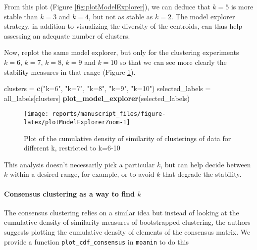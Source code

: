\documentclass[9pt,a4paper,]{extarticle}
\newenvironment{Shaded}{\begin{snugshade}}{\end{snugshade}}
\newcommand{\KeywordTok}[1]{\textcolor[rgb]{0.13,0.29,0.53}{\textbf{#1}}}
\newcommand{\NormalTok}[1]{#1}
\newcommand{\StringTok}[1]{\textcolor[rgb]{0.31,0.60,0.02}{#1}}
\begin{document}
From this plot (Figure \ref{fig:plotModelExplorer}), we can deduce that \(k=5\)
is more stable than \(k=3\) and \(k=4\), but not as stable as \(k=2\). The model
explorer strategy, in addition to visualizing the diversity of the centroids,
can thus help assessing an adequate number of clusters.

Now, replot the same model explorer, but only for the clustering experiments
\(k=6\), \(k=7\), \(k=8\), \(k=9\) and \(k=10\) so that we can see more clearly the stability
measures in that range (Figure \ref{fig:plotModelExplorerZoom}).

\begin{Shaded}
\begin{Highlighting}[]
\NormalTok{clusters =}\StringTok{ }\KeywordTok{c}\NormalTok{(}\StringTok{"k=6"}\NormalTok{, }\StringTok{"k=7"}\NormalTok{, }\StringTok{"k=8"}\NormalTok{, }\StringTok{"k=9"}\NormalTok{, }\StringTok{"k=10"}\NormalTok{)}
\NormalTok{selected_labels =}\StringTok{ }\NormalTok{all_labels[clusters]}
\KeywordTok{plot_model_explorer}\NormalTok{(selected_labels)}
\end{Highlighting}
\end{Shaded}

\begin{figure}[H]

{\centering \texttt{[image: reports/manuscript\_files/figure-latex/plotModelExplorerZoom-1]} 

}

\caption{Plot of the cumulative density of similarity of clusterings of data for different k, restricted to k=6-10}\label{fig:plotModelExplorerZoom}
\end{figure}

This analysis doesn't necessarily pick a particular \(k\), but can help decide
between \(k\) within a desired range, for example, or to avoid \(k\) that degrade
the stability.

\hypertarget{consensus-clustering-as-a-way-to-find-k}{%
\paragraph{\texorpdfstring{Consensus clustering as a way to find \(k\)}{Consensus clustering as a way to find k}}\label{consensus-clustering-as-a-way-to-find-k}}

The consensus clustering \citep{monti:consensus} relies on a similar idea but
instead of looking at the cumulative density of similarity measures of
bootstrapped clustering, the authors suggests plotting the cumulative density
of elements of the consensus matrix. We provide a function
\texttt{plot\_cdf\_consensus} in \texttt{moanin} to do this
\end{document}
